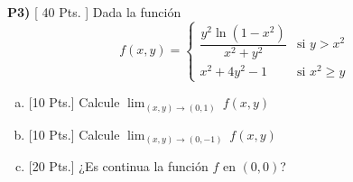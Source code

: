 \documentclass{article}
\begin{document}
\vspace{3mm}
\noindent\textbf{P3) } \textsf{[ 40 Pts. ] } Dada la función
$$f(x,y) =\begin{cases}
  \dfrac{y^2\ln\left(1-x^2\right)}{x^2+y^2} & \text{si } y>x^2\\
  x^2+4y^2-1  & \text{si } x^2\geq y
\end{cases}$$
\begin{enumerate}[a)]
  \item \textsf{[10 Pts.] } Calcule $\displaystyle\lim_{(x,y)\to (0,1)}\ f(x,y)$
  \item \textsf{[10 Pts.] } Calcule $\displaystyle\lim_{(x,y)\to (0,-1)}\ f(x,y)$
  \item \textsf{[20 Pts.] }¿Es continua la función $f$ en $(0,0)$?
\end{enumerate}



\end{document}
